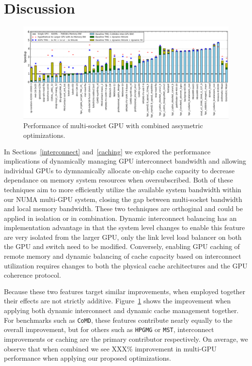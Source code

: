 \section {Discussion}

\label{discussion}
\begin{figure}[tp]
    \centering
    \includegraphics[width=1.0\textwidth]{figures/resultscombined.jpg}
    \caption{Performance of multi-socket GPU with combined assymetric 
optimizations.}
    \label{fig:combined}
\end{figure}

In Sections~\ref{interconnect} and~\ref{caching} we explored the performance 
implications of dynamically managing GPU interconnect bandwidth and allowing 
individual GPUs to dymnamically allocate on-chip cache capacity to decrease 
dependance on memory system resources when oversubscribed.  Both of these 
techniques aim to more efficiently utilize the available system bandwidth within 
our NUMA multi-GPU system, closing the gap between multi-socket bandwidth and 
local memory bandwidth.  These two techniques are orthoginal and could be 
applied in isolation or in combination.  Dynamic interconnect balancing has an 
implementation advantage in that the system level changes to enable this feature 
are very isolated from the larger GPU, only the link level load balancer on both 
the GPU and switch need to be modified.  Conversely, enabling GPU caching of 
remote memory and dynamic balancing of cache capacity based on interconnect 
utilization requires changes to both the physical cache architectures and the 
GPU coherence protocol.

Because these two features target similar improvements, when employed together 
their effects are not strictly additive.  Figure~\ref{fig:combined} shows the 
improvement when applying both dynamic interconnect and dynamic cache management 
together.  For benchmarks such as \texttt{CoMD}, these features contribute 
nearly equally to the overall improvement, but for others such as 
\texttt{HPGMG} or \texttt{MST}, interconnect improvements or caching are the 
primary contributor respectively.  On average, we observe that when combined we 
see XXX\% improvement in multi-GPU performance when applying our proposed 
optimizations.


